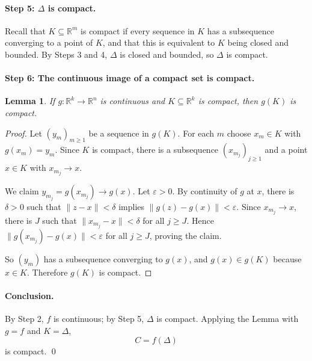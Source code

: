 \documentclass[11pt]{article}
\newtheorem*{lemma}{Lemma}
\newcommand{\R}{\mathbb{R}}
\begin{document}
\paragraph{Step 5: $\Delta$ is compact.}
Recall that $K \subseteq \R^m$ is compact if every sequence in $K$ has a subsequence converging
to a point of $K$, and that this is equivalent to $K$ being closed and bounded. By Steps 3 and 4,
$\Delta$ is closed and bounded, so $\Delta$ is compact.

\paragraph{Step 6: The continuous image of a compact set is compact.}
\begin{lemma}
  If $g \colon \R^k \to \R^n$ is continuous and $K \subseteq \R^k$ is compact, then $g(K)$ is compact.
\end{lemma}
\begin{proof}
  Let $(y_m)_{m \ge 1}$ be a sequence in $g(K)$. For each $m$ choose $x_m \in K$ with
  $g(x_m) = y_m$. Since $K$ is compact, there is a subsequence $(x_{m_j})_{j \ge 1}$ and a point
  $x \in K$ with $x_{m_j} \to x$.

  We claim $y_{m_j} = g(x_{m_j}) \to g(x)$. Let $\varepsilon > 0$. By continuity of $g$ at $x$,
  there is $\delta > 0$ such that $\|z - x\| < \delta$ implies $\|g(z) - g(x)\| < \varepsilon$.
  Since $x_{m_j} \to x$, there is $J$ such that $\|x_{m_j} - x\| < \delta$ for all $j \ge J$.
  Hence $\|g(x_{m_j}) - g(x)\| < \varepsilon$ for all $j \ge J$, proving the claim.

  So $(y_m)$ has a subsequence converging to $g(x)$, and $g(x) \in g(K)$ because $x \in K$.
  Therefore $g(K)$ is compact.
\end{proof}

\paragraph{Conclusion.}
By Step 2, $f$ is continuous; by Step 5, $\Delta$ is compact. Applying the Lemma with
$g = f$ and $K = \Delta$,
\[
  C = f(\Delta)
\]
is compact. \qed
\end{document}
